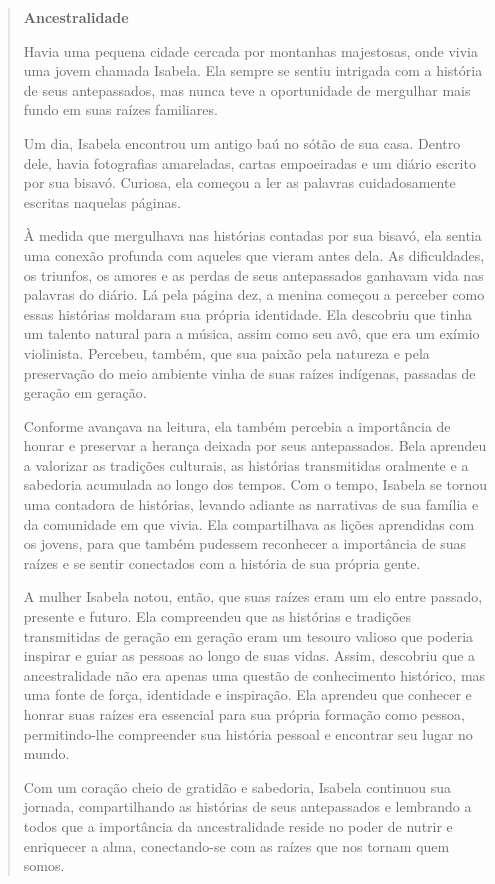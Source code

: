 \begin{quote}
\textbf{Ancestralidade}


Havia uma pequena cidade cercada por montanhas majestosas, onde vivia
uma jovem chamada Isabela. Ela sempre se sentiu intrigada com a história
de seus antepassados, mas nunca teve a oportunidade de mergulhar mais
fundo em suas raízes familiares.

Um dia, Isabela encontrou um antigo baú no sótão de sua casa. Dentro
dele, havia fotografias amareladas, cartas empoeiradas e um diário
escrito por sua bisavó. Curiosa, ela começou a ler as palavras
cuidadosamente escritas naquelas páginas.

À medida que mergulhava nas histórias contadas por sua bisavó, ela
sentia uma conexão profunda com aqueles que vieram antes dela. As
dificuldades, os triunfos, os amores e as perdas de seus antepassados
ganhavam vida nas palavras do diário. Lá pela página dez, a menina
começou a perceber como essas histórias moldaram sua própria identidade.
Ela descobriu que tinha um talento natural para a música, assim como seu
avô, que era um exímio violinista. Percebeu, também, que sua paixão pela
natureza e pela preservação do meio ambiente vinha de suas raízes
indígenas, passadas de geração em geração.

Conforme avançava na leitura, ela também percebia a importância de
honrar e preservar a herança deixada por seus antepassados. Bela
aprendeu a valorizar as tradições culturais, as histórias transmitidas
oralmente e a sabedoria acumulada ao longo dos tempos. Com o tempo,
Isabela se tornou uma contadora de histórias, levando adiante as
narrativas de sua família e da comunidade em que vivia. Ela
compartilhava as lições aprendidas com os jovens, para que também
pudessem reconhecer a importância de suas raízes e se sentir conectados
com a história de sua própria gente.

A mulher Isabela notou, então, que suas raízes eram um elo entre
passado, presente e futuro. Ela compreendeu que as histórias e tradições
transmitidas de geração em geração eram um tesouro valioso que poderia
inspirar e guiar as pessoas ao longo de suas vidas. Assim, descobriu que
a ancestralidade não era apenas uma questão de conhecimento histórico,
mas uma fonte de força, identidade e inspiração. Ela aprendeu que
conhecer e honrar suas raízes era essencial para sua própria formação
como pessoa, permitindo-lhe compreender sua história pessoal e encontrar
seu lugar no mundo.

Com um coração cheio de gratidão e sabedoria, Isabela continuou sua
jornada, compartilhando as histórias de seus antepassados e lembrando a
todos que a importância da ancestralidade reside no poder de nutrir e
enriquecer a alma, conectando-se com as raízes que nos tornam quem
somos.

\end{quote}

